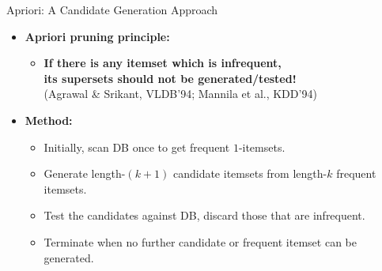 \begin{frame}{Apriori: A Candidate Generation Approach}
	\begin{itemize}
		\item \textbf{Apriori pruning principle:}
		      \begin{itemize}
			      \item \textbf{\color{airforceblue}If there is any itemset which is
				            infrequent, \\ its supersets should not be generated/tested!} \\
			            (Agrawal \& Srikant, VLDB'94; Mannila et al., KDD'94)
		      \end{itemize}
		\item \textbf{Method:}
		      \begin{itemize}
			      \item Initially, scan DB once to get frequent $1$-itemsets.
			      \item Generate length-$(k+1)$ candidate itemsets from length-$k$
			            frequent itemsets.
			      \item Test the candidates against DB, discard those that are
			            infrequent.
			      \item Terminate when no further candidate or frequent itemset can
			            be generated.
		      \end{itemize}
	\end{itemize}
\end{frame}

